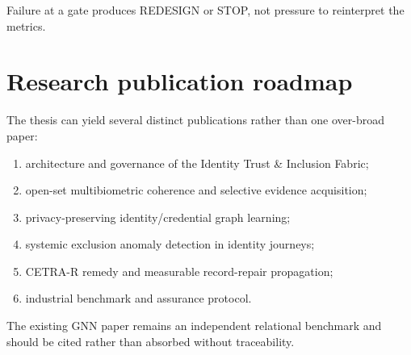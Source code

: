 Failure at a gate produces REDESIGN or STOP, not pressure to reinterpret the metrics.

\section{Research publication roadmap}

The thesis can yield several distinct publications rather than one over-broad paper:

\begin{enumerate}
\item architecture and governance of the Identity Trust \& Inclusion Fabric;
\item open-set multibiometric coherence and selective evidence acquisition;
\item privacy-preserving identity/credential graph learning;
\item systemic exclusion anomaly detection in identity journeys;
\item CETRA-R remedy and measurable record-repair propagation;
\item industrial benchmark and assurance protocol.
\end{enumerate}

The existing GNN paper remains an independent relational benchmark and should be cited rather than absorbed without traceability.

